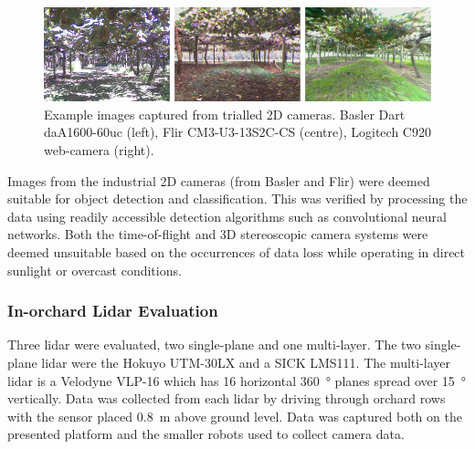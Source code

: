 \documentclass[preprint,authoryear,12pt]{elsarticle}
\begin{document}
        \begin{figure}[htb]
            \centering
            \includegraphics[width=\linewidth]{imgs/camera_comparison/camera_comparison.pdf}
            \caption{
                Example images captured from trialled 2D cameras.
                Basler Dart daA1600-60uc (left), Flir CM3-U3-13S2C-CS (centre), Logitech C920 web-camera (right).
            }
            \label{fig:canopyDataCloud}
        \end{figure}

        Images from the industrial 2D cameras (from Basler and Flir) were deemed suitable for object detection and classification.
        This was verified by processing the data using readily accessible detection algorithms such as convolutional neural networks.
        Both the time-of-flight and 3D stereoscopic camera systems were deemed unsuitable based on the occurrences of data loss while operating in direct sunlight or overcast conditions.

    \subsubsection{In-orchard Lidar Evaluation}
        Three lidar were evaluated, two single-plane and one multi-layer.
        The two single-plane lidar were the Hokuyo UTM-30LX and a SICK LMS111.
        The multi-layer lidar is a Velodyne VLP-16 which has 16 horizontal \SI{360}{\degree} planes spread over \SI{15}{\degree} vertically.
        Data was collected from each lidar by driving through orchard rows with the sensor placed \SI{0.8}{\meter} above ground level.
        Data was captured both on the presented platform and the smaller robots used to collect camera data.
\end{document}
